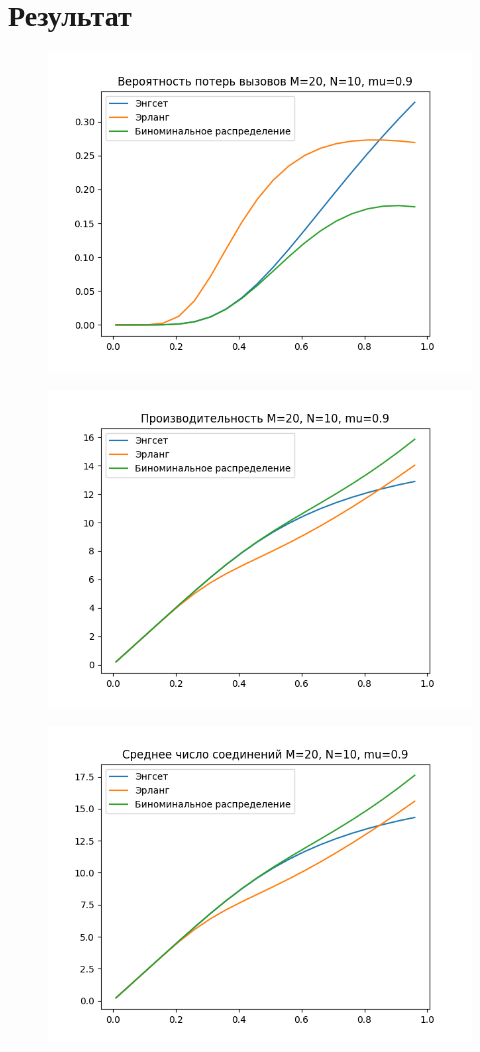 \documentclass[12pt]{article}
\begin{document}
\section{Результат}

\begin{figure}[htp]
\centering
\includegraphics[scale=1.00]{loss_prob_M20_N10_mu09.png}
\caption{}
\label{}
\end{figure}

\begin{figure}[htp]
\centering
\includegraphics[scale=1.00]{perf_M20_N10_mu09.png}
\caption{}
\label{}
\end{figure}

\begin{figure}[htp]
\centering
\includegraphics[scale=1.00]{aver_conn_M20_N10_mu09.png}
\caption{}
\label{}
\end{figure}
\end{document}
